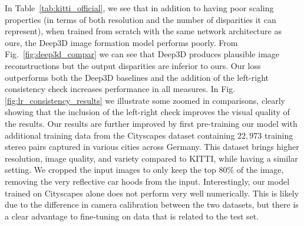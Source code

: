 \documentclass[10pt,twocolumn,letterpaper]{article}
\begin{document}
In Table~\ref{tab:kitti_official}, we see that in addition to having poor scaling properties (in terms of both resolution and the number of disparities it can represent), when trained from scratch with the same network architecture as ours, the Deep3D \cite{xie2016deep3d} image formation model performs poorly.
From Fig.~\ref{fig:deep3d_compar} we can see that Deep3D produces plausible image reconstructions but the output disparities are inferior to ours.
Our loss outperforms both the Deep3D baselines and the addition of the left-right consistency check increases performance in all measures.
In Fig. \ref{fig:lr_consistency_results} we illustrate some zoomed in comparisons, clearly showing that the inclusion of the left-right check improves the visual quality of the results. 
Our results are further improved by first pre-training our model with additional training data from the Cityscapes dataset \cite{Cordts2016Cityscapes} containing $22,973$ training stereo pairs captured in various cities across Germany. 
This dataset brings higher resolution, image quality, and variety compared to KITTI, while having a similar setting. 
We cropped the input images to only keep the top 80\% of the image, removing the very reflective car hoods from the input.
Interestingly, our model trained on Cityscapes alone does not perform very well numerically. 
This is likely due to the difference in camera calibration between the two datasets, but there is a clear advantage to fine-tuning on data that is related to the test set.
\end{document}
